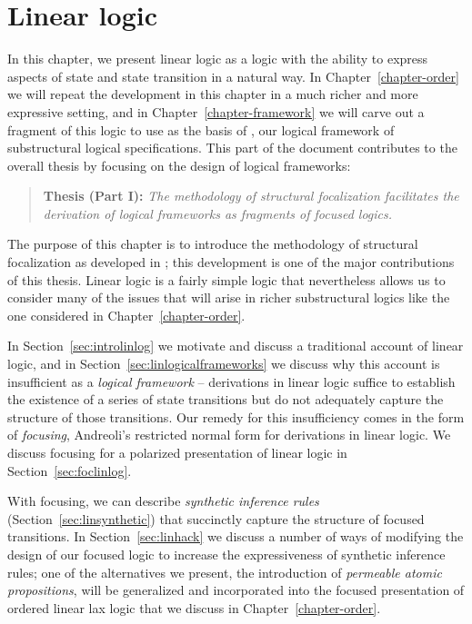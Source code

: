 \chapter{Linear logic}
\label{chapter-foc}

In this chapter, we present linear logic as a logic with the ability
to express aspects of state and state transition in a natural way.  In
Chapter~\ref{chapter-order} 
we will repeat the development in this chapter in a much
richer and more expressive setting, and in Chapter~\ref{chapter-framework} 
we will carve out
a fragment of this logic to use as the basis of \sls, our logical
framework of substructural logical specifications. This part of the
document contributes to the overall thesis by focusing on the design
of logical frameworks:

\smallskip
\begin{quote} {\bf Thesis (Part I):} {\it The methodology of
    structural focalization facilitates the derivation of logical
    frameworks as fragments of focused logics.}
\end{quote}
\smallskip

\noindent
The purpose of this chapter is to introduce the methodology of
structural focalization as developed in \cite{simmons11structural};
this development is one of the major contributions of this thesis.
Linear logic is a fairly simple logic that nevertheless allows us to
consider many of the issues that will arise in richer substructural
logics like the one considered in Chapter~\ref{chapter-order}.

In Section~\ref{sec:introlinlog} we motivate and discuss a traditional
account of linear logic, and in
Section~\ref{sec:linlogicalframeworks} we discuss why this account is
insufficient as a {\it logical framework} -- derivations in linear
logic suffice to establish the existence of a series of state
transitions but do not adequately capture the structure of those
transitions. Our remedy for this insufficiency comes in the form of
{\it focusing}, Andreoli's restricted normal form for derivations in
linear logic. We discuss focusing for a polarized presentation of
linear logic in Section~\ref{sec:foclinlog}.

With focusing, we can describe {\it synthetic inference rules}
(Section~\ref{sec:linsynthetic}) that succinctly capture the structure
of focused transitions. In Section~\ref{sec:linhack} we discuss a
number of ways of modifying the design of our focused logic to
increase the expressiveness of synthetic inference rules; one of the
alternatives we present, the introduction of {\it permeable atomic
  propositions}, will be generalized and incorporated into the focused
presentation of ordered linear lax logic that we discuss in 
Chapter~\ref{chapter-order}.


